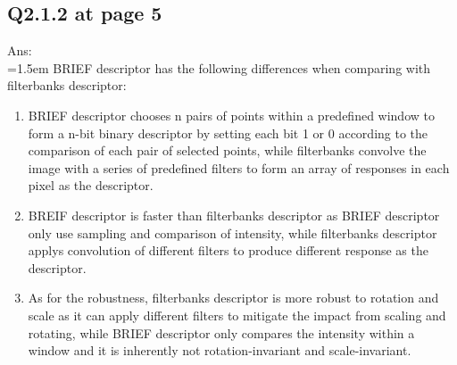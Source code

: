 \documentclass[12pt]{article}
\begin{document}
	\newpage
	\subsection*{Q2.1.2 at page 5}
	Ans:\\
	\hangindent=1.5em \hspace{1.5em} BRIEF descriptor has the following differences when comparing with filterbanks descriptor:
	\begin{enumerate}
		\item BRIEF descriptor chooses n pairs of points within a predefined window to form a n-bit binary descriptor by setting each bit 1 or 0 according to the comparison of each pair of selected points, while filterbanks convolve the image with a series of predefined filters to form an array of responses in each pixel as the descriptor.
		\item BREIF descriptor is faster than filterbanks descriptor as BRIEF descriptor only use sampling and comparison of intensity, while filterbanks descriptor applys convolution of different filters to produce different response as the descriptor. 
		\item As for the robustness, filterbanks descriptor is more robust to rotation and scale as it can apply different filters to mitigate the impact from scaling and rotating, while BRIEF descriptor only compares the intensity within a window and it is inherently not rotation-invariant and scale-invariant. 
	\end{enumerate}
	
	\newpage
\end{document}
